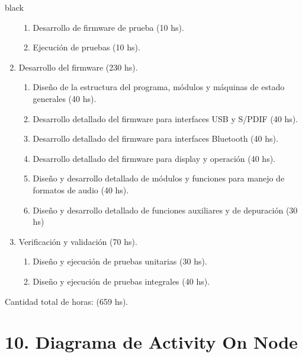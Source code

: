 \documentclass[
11pt, %
codirector, %
]{charter}
\begin{document}
\begin{consigna}{black}
\begin{enumerate}
\begin{enumerate}
	\item Desarrollo de firmware de prueba (10 hs).
	\item Ejecución de pruebas (10 hs).
	\end{enumerate}
\item Desarrollo del firmware (230 hs).
	\begin{enumerate}
	\item Diseño de la estructura del programa, módulos y máquinas de estado generales (40 hs).
	\item Desarrollo detallado del firmware para interfaces USB y S/PDIF (40 hs).
	\item Desarrollo detallado del firmware para interfaces Bluetooth (40 hs).
	\item Desarrollo detallado del firmware para display y operación (40 hs).
	\item Diseño y desarrollo detallado de módulos y funciones para manejo de formatos de audio (40 hs).
	\item Diseño y desarrollo detallado de funciones auxiliares y de depuración (30 hs)
	\end{enumerate}
\item Verificación y validación (70 hs).	
	\begin{enumerate}
	\item Diseño y ejecución de pruebas unitarias (30 hs).
	\item Diseño y ejecución de pruebas integrales (40 hs).
	\end{enumerate}	
\end{enumerate}

Cantidad total de horas: (659 hs).

\end{consigna}

\section{10. Diagrama de Activity On Node}
\label{sec:AoN}
\end{document}
